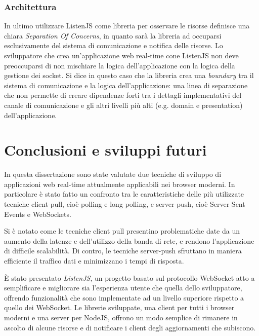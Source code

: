 \documentclass[12pt,a4paper,openright,twoside]{report}
\begin{document}
\subsection{Architettura}
In ultimo utilizzare ListenJS come libreria per osservare le risorse definisce una chiara \textit{Separation Of Concerns}, in quanto sarà la libreria ad occuparsi esclusivamente del sistema di comunicazione e notifica delle risorse. Lo sviluppatore che crea un'applicazione web real-time cone ListenJS non deve preoccuparsi di non mischiare la logica dell'applicazione con la logica della gestione dei socket. Si dice in questo caso che la libreria crea una \textit{boundary} tra il sistema di comunicazione e la logica dell'applicazione: una linea di separazione che non permette di creare dipendenze forti tra i dettagli implementativi del canale di comunicazione e gli altri livelli più alti (e.g. domain e presentation) dell'applicazione.

\clearpage{\pagestyle{empty}\cleardoublepage}
\chapter*{Conclusioni e sviluppi futuri}
In questa dissertazione sono state valutate due tecniche di sviluppo di applicazioni web real-time attualmente applicabili nei browser moderni. In particolare è stato fatto un confronto tra le caratteristiche delle più utilizzate tecniche client-pull, cioè polling e long polling, e server-push, cioè Server Sent Events e WebSockets.

Si è notato come le tecniche client pull presentino problematiche date da un aumento della latenze e dell'utilizzo della banda di rete, e rendono l'applicazione di difficile scalabilità. Di contro, le tecniche server-push sfruttano in maniera efficiente il traffico dati e minimizzano i tempi di risposta.

\bigskip

È stato presentato \textit{ListenJS}, un progetto basato sul protocollo WebSocket atto a semplificare e migliorare sia l'esperienza utente che quella dello sviluppatore, offrendo funzionalità che sono implementate ad un livello superiore rispetto a quello dei WebSocket. Le librerie sviluppate, una client per tutti i browser moderni e una server per NodeJS, offrono un modo semplice di rimanere in ascolto di alcune risorse e di notificare i client degli aggiornamenti che subiscono.
\end{document}
